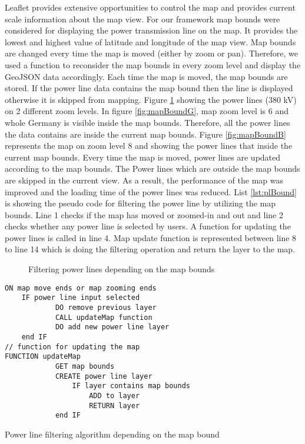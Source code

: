 Leaflet provides extensive opportunities to control the map and provides current scale information about the map view. For our framework map bounds were considered for displaying the power transmission line on the map. It provides the lowest and highest value of latitude and longitude of the map view. Map bounds are changed every time the map is moved (either by zoom or pan).  Therefore, we used a function to reconsider the map bounds in every zoom level and display the GeoJSON data accordingly. Each time the map is moved, the map bounds are stored. If the power line data contains the map bound then the line is displayed otherwise it is skipped from mapping. Figure \ref{fig:mpbound} showing the power lines (380 kV) on 2 different zoom levels. In figure \ref{fig:mapBoundG}, map zoom level is 6 and whole Germany is visible inside the map bounds. Therefore, all the power lines the data contains are inside the current map bounds. Figure \ref{fig:mapBoundB} represents the map on zoom level 8 and showing the power lines that inside the current map bounds. Every time the map is moved, power lines are updated according to the map bounds. The Power lines which are outside the map bounds are skipped in the current view. As a result, the performance of the map was improved and the loading time of the power lines was reduced. List \ref{lst:plBound} is showing the pseudo code for filtering the power line by utilizing the map bounds. Line 1 checks if the map has moved or zoomed-in and out and line 2 checks whether any power line is selected by users. A function for updating the power lines is called in line 4. Map update function is represented between line 8 to line 14 which is doing the filtering operation and return the layer to the map. 

\begin{figure}
  \begin{center}
\hfill
{}
\hfill
\caption{Filtering power lines depending on the map bounds}
\label{fig:mpbound}
\end{center}
\end{figure}

\begin{Listing}
\begin{lstlisting}
ON map move ends or map zooming ends
	IF power line input selected
			DO remove previous layer
			CALL updateMap function
			DO add new power line layer
	end IF
// function for updating the map
FUNCTION updateMap
			GET map bounds
			CREATE power line layer
				IF layer contains map bounds
					ADD to layer
					RETURN layer
			end IF
\end{lstlisting}
\caption{Power line filtering algorithm depending on the map bound}
\label{lst:plBound}
\end{Listing}

